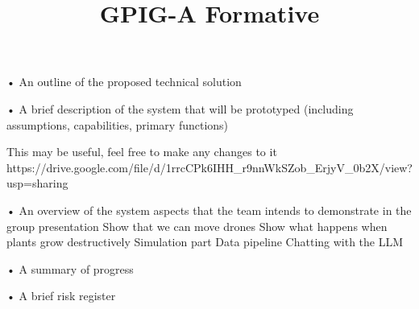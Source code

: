 \documentclass{article}
\title{GPIG-A Formative}
\begin{document}
\maketitle

• An outline of the proposed technical solution


• A brief description of the system that will be prototyped (including assumptions, capabilities, primary functions)

This may be useful, feel free to make any changes to it
https://drive.google.com/file/d/1rrcCPk6IHH\_r9nnWkSZob\_ErjyV\_0b2X/view?usp=sharing


• An overview of the system aspects that the team intends to demonstrate in the group 
presentation
    Show that we can move drones
    Show what happens when plants grow destructively
        Simulation part
        Data pipeline 
    Chatting with the LLM


• A summary of progress


• A brief risk register
\end{document}
